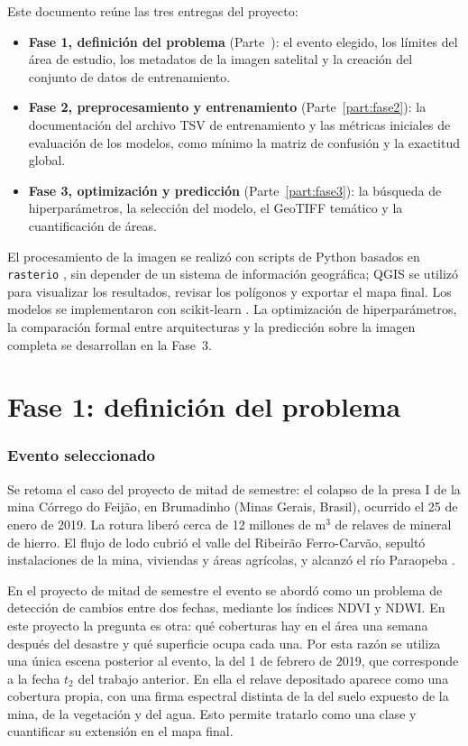\documentclass{article}
\begin{document}
Este documento reúne las tres entregas del proyecto:
\begin{itemize}
 \item \textbf{Fase 1, definición del problema} (Parte~\ref{part:fase1}): el evento elegido, los límites del área de estudio, los metadatos de la imagen satelital y la creación del conjunto de datos de entrenamiento.
 \item \textbf{Fase 2, preprocesamiento y entrenamiento} (Parte~\ref{part:fase2}): la documentación del archivo TSV de entrenamiento y las métricas iniciales de evaluación de los modelos, como mínimo la matriz de confusión y la exactitud global.
 \item \textbf{Fase 3, optimización y predicción} (Parte~\ref{part:fase3}): la búsqueda de hiperparámetros, la selección del modelo, el GeoTIFF temático y la cuantificación de áreas.
\end{itemize}
El procesamiento de la imagen se realizó con scripts de Python basados en \texttt{rasterio} \parencite{GDAL}, sin depender de un sistema de información geográfica; QGIS \parencite{QGIS_Software} se utilizó para visualizar los resultados, revisar los polígonos y exportar el mapa final. Los modelos se implementaron con scikit-learn \parencite{Pedregosa2011}. La optimización de hiperparámetros, la comparación formal entre arquitecturas y la predicción sobre la imagen completa se desarrollan en la Fase~3.

\part{Fase 1: definición del problema}
\label{part:fase1}

\section{Evento seleccionado}
Se retoma el caso del proyecto de mitad de semestre: el colapso de la presa I de la mina Córrego do Feijão, en Brumadinho (Minas Gerais, Brasil), ocurrido el 25 de enero de 2019. La rotura liberó cerca de 12 millones de m$^3$ de relaves de mineral de hierro. El flujo de lodo cubrió el valle del Ribeirão Ferro-Carvão, sepultó instalaciones de la mina, viviendas y áreas agrícolas, y alcanzó el río Paraopeba \parencite{Rotta2020}.

En el proyecto de mitad de semestre el evento se abordó como un problema de detección de cambios entre dos fechas, mediante los índices NDVI y NDWI. En este proyecto la pregunta es otra: qué coberturas hay en el área una semana después del desastre y qué superficie ocupa cada una. Por esta razón se utiliza una única escena posterior al evento, la del 1 de febrero de 2019, que corresponde a la fecha $t_2$ del trabajo anterior. En ella el relave depositado aparece como una cobertura propia, con una firma espectral distinta de la del suelo expuesto de la mina, de la vegetación y del agua. Esto permite tratarlo como una clase y cuantificar su extensión en el mapa final.
\end{document}

